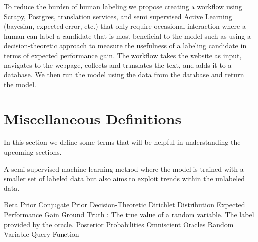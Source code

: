 To reduce the burden of human labeling we propose creating a workflow using Scrapy, Postgres, translation services, and semi supervised Active Learning (bayesian, expected error, etc.) that only require occasional interaction where a human can label a candidate that is most beneficial to the model such as using a decision-theoretic approach to measure the usefulness of a labeling candidate in terms of expected performance gain. The workflow takes the website as input, navigates to the webpage, collects and translates the text, and adds it to a database. We then run the model using the data from the database and return the model. 


\section{Miscellaneous Definitions}

In this section we define some terms that will be helpful in understanding the upcoming sections.

\begin{defn}
\label{def:active-learning}
A semi-supervised machine learning method where the model is trained with a smaller set of labeled data but also aims to exploit trends within the unlabeled data.
\end{defn}

Beta Prior
Conjugate Prior
Decision-Theoretic
Dirichlet Distribution
Expected Performance Gain
Ground Truth : The true value of a random variable. The label provided by the oracle.
Posterior Probabilities
Omniscient Oracles
Random Variable
Query Function


